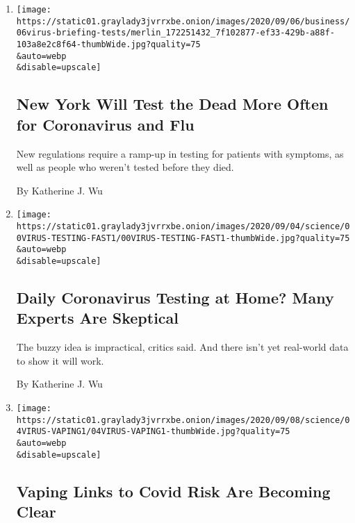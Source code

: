\begin{enumerate}
\def\labelenumi{\arabic{enumi}.}
\item
  \href{/2020/09/06/health/covid-flu-testing.html}{}

  \texttt{[image: https://static01.graylady3jvrrxbe.onion/images/2020/09/06/business/06virus-briefing-tests/merlin\_172251432\_7f102877-ef33-429b-a88f-103a8e2c8f64-thumbWide.jpg?quality=75\\\&auto=webp\\\&disable=upscale]}

  \hypertarget{new-york-will-test-the-dead-more-often-for-coronavirus-and-flu}{%
  \subsection{New York Will Test the Dead More Often for Coronavirus and
  Flu}\label{new-york-will-test-the-dead-more-often-for-coronavirus-and-flu}}

  New regulations require a ramp-up in testing for patients with
  symptoms, as well as people who weren't tested before they died.

  By Katherine J. Wu
\item
  \href{/2020/09/06/health/coronavirus-rapid-test.html}{}

  \texttt{[image: https://static01.graylady3jvrrxbe.onion/images/2020/09/04/science/00VIRUS-TESTING-FAST1/00VIRUS-TESTING-FAST1-thumbWide.jpg?quality=75\\\&auto=webp\\\&disable=upscale]}

  \hypertarget{daily-coronavirus-testing-at-home-many-experts-are-skeptical}{%
  \subsection{Daily Coronavirus Testing at Home? Many Experts Are
  Skeptical}\label{daily-coronavirus-testing-at-home-many-experts-are-skeptical}}

  The buzzy idea is impractical, critics said. And there isn't yet
  real-world data to show it will work.

  By Katherine J. Wu
\item
  \href{/2020/09/04/health/covid-vaping-smoking.html}{}

  \texttt{[image: https://static01.graylady3jvrrxbe.onion/images/2020/09/08/science/04VIRUS-VAPING1/04VIRUS-VAPING1-thumbWide.jpg?quality=75\\\&auto=webp\\\&disable=upscale]}

  \hypertarget{vaping-links-to-covid-risk-are-becoming-clear}{%
  \subsection{Vaping Links to Covid Risk Are Becoming
  Clear}\label{vaping-links-to-covid-risk-are-becoming-clear}}


\end{enumerate}

